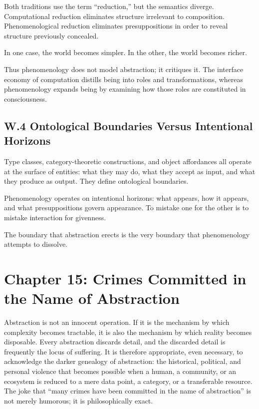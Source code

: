 \documentclass[12pt,letterpaper]{article}
\theoremstyle{remark}
\begin{document}
Both traditions use the term ``reduction,'' but the semantics diverge. Computational reduction eliminates structure irrelevant to composition. Phenomenological reduction eliminates presuppositions in order to reveal structure previously concealed.

In one case, the world becomes simpler.  
In the other, the world becomes richer.

Thus phenomenology does not model abstraction; it critiques it. The interface economy of computation distills being into roles and transformations, whereas phenomenology expands being by examining how those roles are constituted in consciousness.

\subsection{W.4 Ontological Boundaries Versus Intentional Horizons}

Type classes, category-theoretic constructions, and object affordances all operate at the surface of entities: what they may do, what they accept as input, and what they produce as output. They define ontological boundaries.

Phenomenology operates on intentional horizons: what appears, how it appears, and what presuppositions govern appearance. To mistake one for the other is to mistake interaction for givenness.

The boundary that abstraction erects is the very boundary that phenomenology attempts to dissolve.

\newpage

\section{Chapter 15: Crimes Committed in the Name of Abstraction}

Abstraction is not an innocent operation. If it is the mechanism by which complexity becomes tractable, it is also the mechanism by which reality becomes disposable. Every abstraction discards detail, and the discarded detail is frequently the locus of suffering. It is therefore appropriate, even necessary, to acknowledge the darker genealogy of abstraction: the historical, political, and personal violence that becomes possible when a human, a community, or an ecosystem is reduced to a mere data point, a category, or a transferable resource. The joke that ``many crimes have been committed in the name of abstraction'' is not merely humorous; it is philosophically exact.
\end{document}
